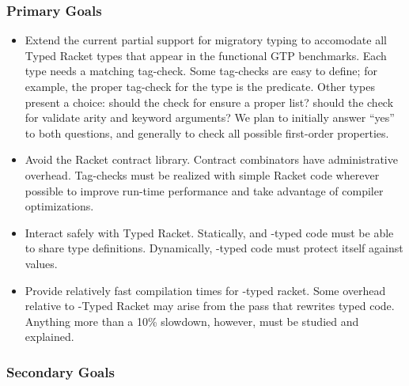 \subsubsection{Primary Goals}

\begin{itemize}
  \item
    Extend the current partial support for \tshallow{} migratory typing
     to accomodate all Typed Racket types that appear in the functional GTP
     benchmarks.
    Each type needs a matching tag-check.
    Some tag-checks are easy to define; for example, the proper tag-check for
     the  type is the  predicate.
    Other types present a choice:
     should the check for  ensure a proper list?
     should the check for \racketcode{->*} validate arity and keyword arguments?
    We plan to initially answer ``yes'' to both questions, and generally to check
     all possible first-order properties.
  \item
    Avoid the Racket contract library.
    Contract combinators have administrative overhead.
    Tag-checks must be realized with simple Racket code wherever possible to
     improve run-time performance and take advantage of compiler optimizations.
  \item
    Interact safely with Typed Racket.
    Statically, \tshallow{} and \tdeep{}-typed code must be able to share type definitions.
    Dynamically, \tdeep{}-typed code must protect itself against \tshallow{} values.
  \item
    Provide relatively fast compilation times for \tshallow{}-typed racket.
    Some overhead relative to \tdeep{}-Typed Racket may arise from the pass that
    rewrites typed code.
    Anything more than a 10\% slowdown, however, must be studied and explained.
\end{itemize}


\subsubsection{Secondary Goals}

